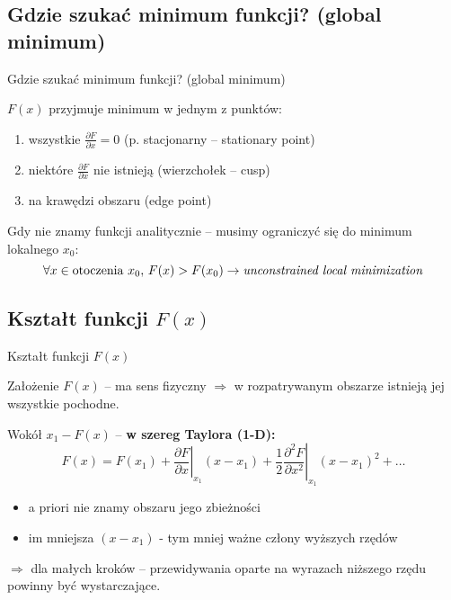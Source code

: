\subsection{Gdzie szukać minimum funkcji? (global minimum)}

  \begin{frame}{Gdzie szukać minimum funkcji? (global minimum)}
    \begin{block}{$ F(x) $ przyjmuje minimum w jednym z punktów:}
      \begin{enumerate}
        \item wszystkie $ \frac{\partial F}{\partial x} = 0 $
        (p. stacjonarny -- stationary point)
        \item niektóre $ \frac{\partial F}{\partial x} $
        nie istnieją (wierzchołek -- cusp)
        \item na krawędzi obszaru (edge point)
      \end{enumerate}
    \end{block}
    Gdy nie znamy funkcji analitycznie -- musimy ograniczyć
    się do minimum lokalnego $ x_0 $:
    \begin{displaymath}
      \forall x \in \text{otoczenia}\ x_0{,}\ F(x) > F(x_0)
      \to \text{\emph{unconstrained local minimization}}
    \end{displaymath}
  \end{frame}

\subsection{Kształt funkcji $ F(x) $}
  \begin{frame}{Kształt funkcji $ F(x) $}
    \begin{block}{Założenie}
      $ F(x) $ -- ma sens fizyczny $ \Rightarrow $ w rozpatrywanym
      obszarze istnieją jej wszystkie pochodne.
    \end{block}
    Wokół $ x_1 - F(x) $ -- \textbf{w szereg Taylora (1-D):}
    \begin{displaymath}
      F(x) = F(x_1) + \left. \frac{\partial F}{\partial x} \right|_{x_1}(x - x_1) +
      \left. \frac{1}{2} \frac{\partial^2 F}{\partial x^2} \right|_{x_1}(x - x_1)^2 +
      \dots
    \end{displaymath}
    \begin{itemize}
      \item a priori nie znamy obszaru jego zbieżności
      \item im mniejsza $ (x - x_1) $ - tym mniej ważne człony
      wyższych rzędów
    \end{itemize}
    $ \Rightarrow $ dla małych kroków -- przewidywania oparte
    na wyrazach niższego rzędu powinny być wystarczające.

  \end{frame}

